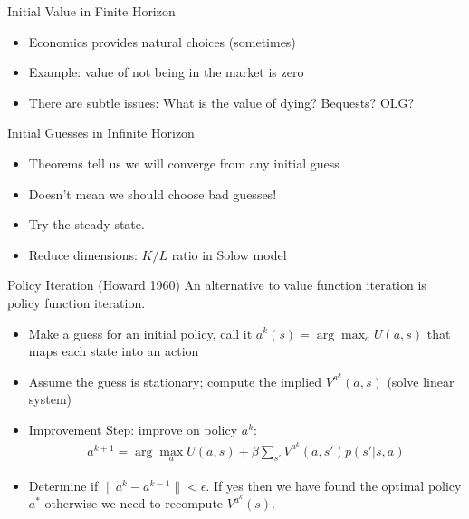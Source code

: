 \documentclass[xcolor=pdftex,dvipsnames,table,mathserif,aspectratio=169]{beamer}
\begin{document}
\begin{frame}{Initial Value in Finite Horizon}
\begin{itemize}
\item Economics provides natural choices (sometimes)
\item Example: value of not being in the market is zero
\item There are subtle issues: What is the value of dying? Bequests? OLG?
\end{itemize}
\end{frame}

\begin{frame}{Initial Guesses in Infinite Horizon}
\begin{itemize}
\item Theorems tell us we will converge from any initial guess
\item Doesn't mean we should choose bad guesses!
\item Try the steady state.
\item Reduce dimensions:  $K/L$ ratio in Solow model
\end{itemize}
\end{frame}



\begin{frame}{Policy Iteration (Howard 1960)}
An alternative to value function iteration is policy function iteration. 
\begin{itemize}
\item Make a guess for an initial policy, call it $a^k(s) = \arg \max_a U(a,s)$ that maps each state into an action
\item Assume the guess is stationary;  compute the implied $V^{a^k}(a,s)$ (solve linear system)
\item Improvement Step: improve on policy $a^k$:
\begin{eqnarray*}
a^{k+1} = \arg \max_a U(a,s) + \beta \sum_{s'} V^{a^k}(a,s') p(s' | s,a)
\end{eqnarray*}
\item Determine if $\| a^k -a^{k-1}\| < \epsilon$. If yes then we have found the optimal policy $a^* $ otherwise we need to recompute $V^{a^k}(s)$.
\end{itemize}
\end{frame}
\end{document}
